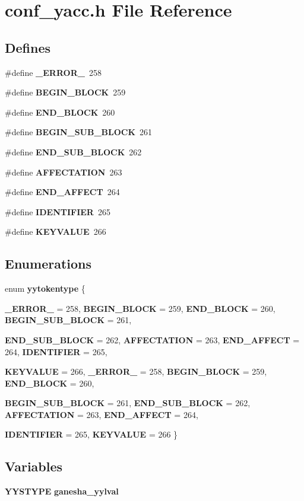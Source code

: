 \section{conf\_\-yacc.h File Reference}
\label{conf__yacc_8h}
\subsection*{Defines}
\begin{DoxyCompactItemize}
\item 
\#define {\bf \_\-ERROR\_\-}~258
\item 
\#define {\bf BEGIN\_\-BLOCK}~259
\item 
\#define {\bf END\_\-BLOCK}~260
\item 
\#define {\bf BEGIN\_\-SUB\_\-BLOCK}~261
\item 
\#define {\bf END\_\-SUB\_\-BLOCK}~262
\item 
\#define {\bf AFFECTATION}~263
\item 
\#define {\bf END\_\-AFFECT}~264
\item 
\#define {\bf IDENTIFIER}~265
\item 
\#define {\bf KEYVALUE}~266
\end{DoxyCompactItemize}
\subsection*{Enumerations}
\begin{DoxyCompactItemize}
\item 
enum {\bf yytokentype} \{ \par
{\bf \_\-ERROR\_\-} =  258, 
{\bf BEGIN\_\-BLOCK} =  259, 
{\bf END\_\-BLOCK} =  260, 
{\bf BEGIN\_\-SUB\_\-BLOCK} =  261, 
\par
{\bf END\_\-SUB\_\-BLOCK} =  262, 
{\bf AFFECTATION} =  263, 
{\bf END\_\-AFFECT} =  264, 
{\bf IDENTIFIER} =  265, 
\par
{\bf KEYVALUE} =  266, 
{\bf \_\-ERROR\_\-} =  258, 
{\bf BEGIN\_\-BLOCK} =  259, 
{\bf END\_\-BLOCK} =  260, 
\par
{\bf BEGIN\_\-SUB\_\-BLOCK} =  261, 
{\bf END\_\-SUB\_\-BLOCK} =  262, 
{\bf AFFECTATION} =  263, 
{\bf END\_\-AFFECT} =  264, 
\par
{\bf IDENTIFIER} =  265, 
{\bf KEYVALUE} =  266
 \}
\end{DoxyCompactItemize}
\subsection*{Variables}
\begin{DoxyCompactItemize}
\item 
{\bf YYSTYPE} {\bf ganesha\_\-yylval}
\end{DoxyCompactItemize}



